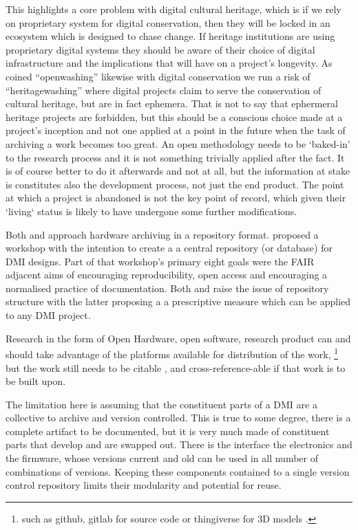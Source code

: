 This highlights a core problem with digital cultural heritage, which is if we rely on proprietary system for digital conservation, then they will be locked in an ecosystem which is designed to chase change. If heritage institutions are using proprietary digital systems \cite{innocente_framework_2023} they should be aware of their choice of digital infrastructure and the implications that will have on a project's longevity. As \textcite{bonvoisin_source_2017} coined ``openwashing'' likewise with digital conservation we run a risk of ``heritagewashing'' where digital projects claim to serve the conservation of cultural heritage, but are in fact ephemera. That is not to say that ephermeral heritage projects are forbidden, but this should be a conscious choice made at a project's inception and not one applied at a point in the future when the task of archiving a work becomes too great. An open methodology needs to be `baked-in' to the research process and it is not something trivially applied after the fact. It is of course better to do it afterwards and not at all, but the information at stake is constitutes also the development process, not just the end product. The point at which a project is abandoned is not the key point of record, which given their `living` status is likely to have undergone some further modifications.

Both \textcite{mcpherson_nimehub_2016} and \cite{fiordelmondo_towards_2025} approach hardware archiving in a repository format. \textcite{mcpherson_nimehub_2016} proposed a workshop with the intention to create a a central repository (or database) for DMI designs. Part of that workshop's primary eight goals were the FAIR adjacent aims of encouraging reproducibility, open access and encouraging a normalised practice of documentation. Both \textcite{mcpherson_nimehub_2016} and \cite{fiordelmondo_towards_2025} raise the issue of repository structure with the latter proposing a a prescriptive measure which can be applied to any DMI project.

Research in the form of Open Hardware, open software, research product can and should take advantage of the platforms available for distribution of the work,
\footnote{such as github, gitlab for source code or thingiverse for 3D models \cite{oshwa_best_2013}.}
but the work still needs to be citable \cite{smith_software_2016}, and cross-reference-able \cite{stall_journal_2023} if that work is to be built upon.

The limitation here is assuming that the constituent parts of a DMI are a collective to archive and version controlled. This is true to some degree, there is a complete artifact to be documented, but it is very much made of constituent parts that develop and are swapped out. There is the interface the electronics and the firmware, whose versions current and old can be used in all number of combinations of versions. Keeping these components contained to a single version control repository limits their modularity and potential for reuse.

